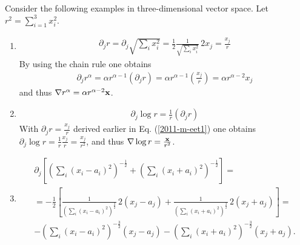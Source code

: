 {
\color{blue}
\bexample

Consider the following examples in three-dimensional vector space.
Let $r^2 = \sum_{i=1 }^3 x_i^2$.

\begin{enumerate}
\item
\begin{equation}
\begin{split}
  \partial_jr =  \partial_j \sqrt{\sum_ix_i^2} =
  \frac{1}{2}\frac{1}{\sqrt{\sum_ix_i^2}}\,2x_j =
  \frac{x_j}{r}
\end{split}
\end{equation}
By using the chain  rule one obtains
\begin{equation}
\begin{split}
  \partial_jr^\alpha =
  \alpha r^{\alpha-1}\left(\partial_jr\right) =
  \alpha r^{\alpha-1}\left(\frac{x_j}{r}\right)=
  \alpha r^{\alpha-2}x_j
\end{split}
\label{2011-m-eet1}
\end{equation}
and thus $\nabla r^\alpha = \alpha r^{\alpha-2}{\bf x}$.


\item
\begin{equation}
\begin{split}
  \partial_j \log r=\frac{1}{r}\left(\partial_jr\right)
\end{split}
\end{equation}
With $
  \partial_jr = \frac{x_j}{r}
$  derived earlier in Eq. (\ref{2011-m-eet1}) one obtains
$
 \partial_j \log r= \frac{1}{r}\frac{x_j}{r}=
  \frac{x_j}{r^2}
$,
and thus $\nabla  \log r =\frac{{\bf x}}{r^2}$.

\item
\begin{equation}
\begin{split}
  \partial_j
  \left[
    \left(
      \sum_i\left(x_i-a_i\right)^2
    \right)^{-\frac{1}{2}}+
    \left(
      \sum_i\left(x_i+a_i\right)^2
    \right)^{-\frac{1}{2}}
  \right]=
\\
  = -\frac{1}{2}\left[\frac{1}{\left(\sum_i\left(x_i-a_i\right)^2\right)^
    \frac{3}{2}}\,2\left(x_j-a_j\right)
  +\frac{1}{\left(\sum_i\left(x_i+a_i\right)^2\right)^\frac{3}{2}}\,
    2\left(x_j+a_j\right)\right]= \\
 -\left(\sum_i\left(x_i-a_i\right)^2\right)^{-\frac{3}{2}}\left(x_j-a_j\right)-
    \left(\sum_i\left(x_i+a_i\right)^2\right)^{-\frac{3}{2}}\left(x_j+a_j\right)   .
\end{split}
\end{equation}


\end{enumerate}}
